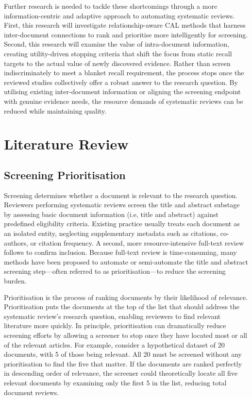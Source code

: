 \documentclass[10pt, english]{article}
\begin{document}
Further research is needed to tackle these shortcomings through a more information-centric and adaptive approach to automating systematic reviews. First, this research will investigate relationship-aware CAL methods that harness inter-document connections to rank and prioritise more intelligently for screening. Second, this research will examine the value of intra-document information, creating utility-driven stopping criteria that shift the focus from static recall targets to the actual value of newly discovered evidence. Rather than screen indiscriminately to meet a blanket recall requirement, the process stops once the reviewed studies collectively offer a robust answer to the research question. By utilising existing inter-document information or aligning the screening endpoint with genuine evidence needs, the resource demands of systematic reviews can be reduced while maintaining quality.

\newpage
\section{Literature Review}

\subsection{Screening Prioritisation}

Screening determines whether a document is relevant to the research question. Reviewers performing systematic reviews screen the title and abstract substage by assessing basic document information (i.e, title and abstract) against predefined eligibility criteria. Existing practice usually treats each document as an isolated entity, neglecting supplementary metadata such as citations, co-authors, or citation frequency.  A second, more resource-intensive full-text review follows to confirm inclusion. Because full-text review is time-consuming, many methods have been proposed to automate or semi-automate the title and abstract screening step—often referred to as prioritisation—to reduce the screening burden.

Prioritisation is the process of ranking documents by their likelihood of relevance. Prioritisation puts the documents at the top of the list that should address the systematic review's research question, enabling reviewers to find relevant literature more quickly. In principle, prioritisation can dramatically reduce screening efforts by allowing a screener to stop once they have located most or all of the relevant articles. For example, consider a hypothetical dataset of 20 documents, with 5 of those being relevant. All 20 must be screened without any prioritisation to find the five that matter. If the documents are ranked perfectly in descending order of relevance, the screener could theoretically locate all five relevant documents by examining only the first 5 in the list, reducing total document reviews. 
\end{document}

